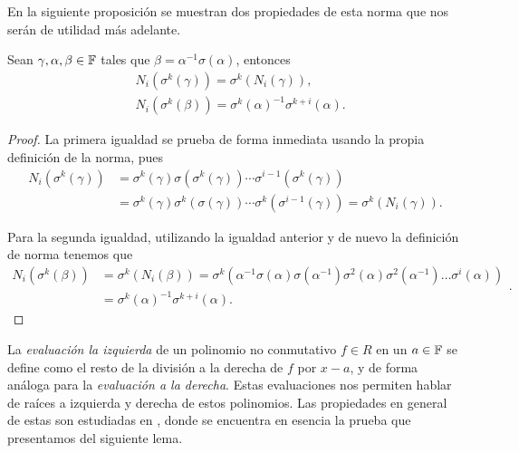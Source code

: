 En la siguiente proposición se muestran dos propiedades de esta norma que nos serán de utilidad más adelante.

\begin{proposition}
\label{prop:norm_properties}
Sean \(\gamma, \alpha, \beta \in \mathbb{F}\) tales que \(\beta = \alpha^{-1}\sigma(\alpha)\), entonces
\[
\begin{aligned}
&N_i(\sigma^{k}(\gamma)) = \sigma^{k}(N_i(\gamma)),\\
&N_i(\sigma^k(\beta)) = \sigma^{k}(\alpha)^{-1} \sigma^{k+i}(\alpha).
\end{aligned}\]
\end{proposition}

\begin{proof}
La primera igualdad se prueba de forma inmediata usando la propia definición de la norma, pues
\[
\begin{aligned}
N_i(\sigma^{k}(\gamma)) &= \sigma^{k}(\gamma) \sigma(\sigma^{k}(\gamma))\cdots \sigma^{i-1}(\sigma^{k}(\gamma)) \\
&= \sigma^{k}(\gamma) \sigma^{k}(\sigma(\gamma))\cdots \sigma^{k}(\sigma^{i-1}(\gamma)) = \sigma^{k}(N_i(\gamma)).
\end{aligned}
\]

Para la segunda igualdad, utilizando la igualdad anterior y de nuevo la definición de norma tenemos que
\[
\begin{aligned}
N_i(\sigma^{k}(\beta)) &= \sigma^{k}(N_i(\beta)) = \sigma^{k}\left(\alpha^{-1}\sigma(\alpha)\sigma(\alpha^{-1})\sigma^{2}(\alpha)\sigma^{2}(\alpha^{-1}) \ldots \sigma^{i}(\alpha) \right) \\
   &= \sigma^{k}(\alpha)^{-1} \sigma^{k+i}(\alpha).
\end{aligned}
.\]
\end{proof}

La \textit{evaluación la izquierda} de un polinomio no conmutativo \(f \in R\) en un \(a \in \mathbb{F}\) se define como el resto de la división a la derecha de \(f\) por  \(x - a\), y de forma análoga para la  \textit{evaluación a la derecha}. Estas evaluaciones nos permiten hablar de raíces a izquierda y derecha de estos polinomios. Las propiedades en general de estas son estudiadas en \cite{lam_vandermonde_1988}, donde se encuentra en esencia la prueba que presentamos del siguiente lema.

